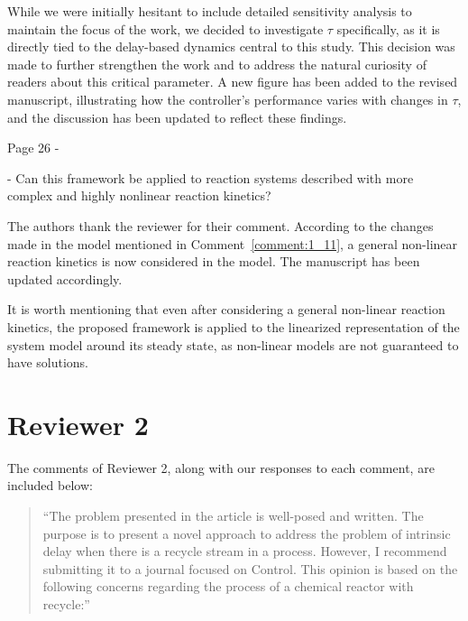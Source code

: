 \documentclass[12pt,answers]{exam}
\begin{document}
\begin{questions}
\begin{solutionorbox}
        While we were initially hesitant to include detailed sensitivity analysis to maintain the focus of the work, we decided to investigate \(\tau\) specifically, as it is directly tied to the delay-based dynamics central to this study. This decision was made to further strengthen the work and to address the natural curiosity of readers about this critical parameter. A new figure has been added to the revised manuscript, illustrating how the controller’s performance varies with changes in \(\tau\), and the discussion has been updated to reflect these findings. 
    \end{solutionorbox}


    \question Page 26 - 

    - Can this framework be applied to reaction systems described with more complex and highly nonlinear reaction kinetics?

    \begin{solutionorbox} \label{comment:1_15}
        The authors thank the reviewer for their comment. According to the changes made in the model mentioned in Comment~\ref{comment:1_11}, a general non-linear reaction kinetics is now considered in the model. The manuscript has been updated accordingly.

        It is worth mentioning that even after considering a general non-linear reaction kinetics, the proposed framework is applied to the linearized representation of the system model around its steady state, as non-linear models are not guaranteed to have solutions.
    \end{solutionorbox}


\end{questions}

\newpage

\section*{Reviewer 2}

The comments of Reviewer 2, along with our responses to each comment, are included below:

\begin{quote}
    ``The problem presented in the article is well-posed and written. The purpose is to present a novel approach to address the problem of intrinsic delay when there is a recycle stream in a process. However, I recommend submitting it to a journal focused on Control. This opinion is based on the following concerns regarding the process of a chemical reactor with recycle:''
\end{quote}
\end{document}
